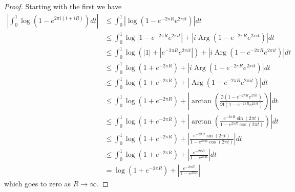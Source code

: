 \documentclass[10pt]{article}
\DeclareMathOperator{\Arg}{Arg}
\theoremstyle{remark}
\theoremstyle{remark}
\begin{document}
\begin{proof}
  Starting with the first we have
  \begin{align*}
    \left|\int_0^1\log(1-e^{2\pi i(t+iR)})dt\right| &\leq \int_0^1\left|\log(1-e^{-2\pi R}e^{2\pi i t})\right|dt\\
                                              &\leq\int_0^1\log|1-e^{-2\pi R}e^{2\pi i t}|+|i\Arg(1-e^{-2\pi R}e^{2\pi it})|dt\\
                                              & \leq\int_0^1\log(|1|+|e^{-2\pi R}e^{2\pi i t}|)+|i\Arg(1-e^{-2\pi R}e^{2\pi it})|dt\\
                                              &\leq\int_0^1\log(1+e^{-2\pi R})+|i\Arg(1-e^{-2\pi R}e^{2\pi it})|dt\\
                                              &\leq\int_0^1\log(1+e^{-2\pi R})+|\Arg(1-e^{-2\pi R}e^{2\pi it})|dt\\
                                              &\leq\int_0^1\log(1+e^{-2\pi R})+|\arctan(\frac{\Im(1-e^{-2\pi R}e^{2\pi it})}{\Re(1-e^{-2\pi R}e^{2\pi it})})|dt\\
                                              &\leq\int_0^1\log(1+e^{-2\pi R})+|\arctan(\frac{e^{-2\pi R}\sin(2\pi t)}{1-e^{2\pi R}\cos(2\pi t)})|dt\\
                                              &\leq\int_0^1\log(1+e^{-2\pi R})+|\frac{e^{-2\pi R}\sin(2\pi t)}{1-e^{2\pi R}\cos(2\pi t)}|dt\\
                                              &\leq\int_0^1\log(1+e^{-2\pi R})+|\frac{e^{-2\pi R}}{1-e^{2\pi R}}|dt\\
                                              &= \log(1+e^{-2\pi R})+|\frac{e^{-2\pi R}}{1-e^{2\pi R}}|
  \end{align*}
  which goes to zero as $R\rightarrow \infty$.


\end{proof}
\end{document}
